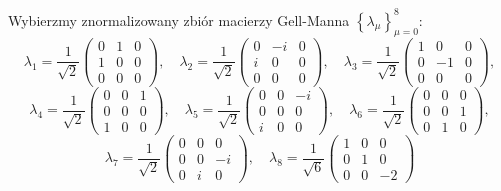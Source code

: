 Wybierzmy znormalizowany zbiór macierzy Gell-Manna
$\left \{ \lambda_{\mu} \right \}_{\mu=0}^{8}$:
\begin{equation}
\nonumber
    \lambda_{1} = \frac{1}{\sqrt{2}} \begin{pmatrix}
            0 & 1 & 0 \\
            1 & 0 & 0 \\
            0 & 0 & 0
        \end{pmatrix}, \quad
    \lambda_{2} = \frac{1}{\sqrt{2}} \begin{pmatrix}
            0 & -i & 0 \\
            i & 0 & 0 \\
            0 & 0 & 0
        \end{pmatrix}, \quad
    \lambda_{3} = \frac{1}{\sqrt{2}} \begin{pmatrix}
            1 & 0 & 0 \\
            0 & -1 & 0 \\
            0 & 0 & 0
        \end{pmatrix},
\end{equation}
\begin{equation}
\nonumber
    \lambda_{4} = \frac{1}{\sqrt{2}} \begin{pmatrix}
            0 & 0 & 1 \\
            0 & 0 & 0 \\
            1 & 0 & 0
        \end{pmatrix}, \quad
    \lambda_{5} = \frac{1}{\sqrt{2}} \begin{pmatrix}
            0 & 0 & -i \\
            0 & 0 & 0 \\
            i & 0 & 0
        \end{pmatrix}, \quad
    \lambda_{6} = \frac{1}{\sqrt{2}} \begin{pmatrix}
            0 & 0 & 0 \\
            0 & 0 & 1 \\
            0 & 1 & 0
        \end{pmatrix},
\end{equation}
\begin{equation}
\nonumber
    \lambda_{7} = \frac{1}{\sqrt{2}} \begin{pmatrix}
            0 & 0 & 0 \\
            0 & 0 & -i \\
            0 & i & 0
        \end{pmatrix}, \quad
    \lambda_{8} = \frac{1}{\sqrt{6}} \begin{pmatrix}
            1 & 0 & 0 \\
            0 & 1 & 0 \\
            0 & 0 & -2
        \end{pmatrix}
\end{equation}

